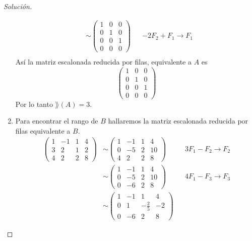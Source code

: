 \documentclass[a4,11pt]{aleph-notas}
\begin{document}
\begin{proof}[Solución]
\begin{enumerate}
\begin{align*}
            & \sim \begin{pmatrix}
            1 & 0 & 0\\
            0 & 1 & 0\\
            0 & 0 & 1\\
            0 & 0 & 0
            \end{pmatrix} &&
            -2F_2+F_1 \to F_1\\                
        \end{align*}
        Así la matriz escalonada reducida por filas, equivalente a $A$ es 
        \[
            \begin{pmatrix}
            1 & 0 & 0\\
            0 & 1 & 0\\
            0 & 0 & 1\\
            0 & 0 & 0
            \end{pmatrix}           
        \]
        Por lo tanto $\rang(A)=3$.
    \item 
        Para encontrar el rango de $B$ hallaremos la matriz escalonada reducida por filas equivalente a $B$.
        \begin{align*}
            \begin{pmatrix}
            1 & -1 & 1 & 4\\
            3 & 2 & 1 & 2\\
            4 & 2 & 2 & 8
            \end{pmatrix}
            & \sim 
            \begin{pmatrix}
            1 & -1 & 1 & 4\\
            0 & -5 & 2 & 10\\
            4 & 2 & 2 & 8
            \end{pmatrix} &&
            3F_1 - F_2 \to F_2\\
            & \sim 
            \begin{pmatrix}
            1 & -1 & 1 & 4\\
            0 & -5 & 2 & 10\\
            0 & -6 & 2 & 8
            \end{pmatrix} &&
            4F_1 - F_3 \to F_3\\
            & \sim 
            \begin{pmatrix}
            1 & -1 & 1 & 4\\
            0 & 1 & -\frac{2}{5} & -2\\
            0 & -6 & 2 & 8
            \end{pmatrix} &&

\end{align*}
\end{enumerate}
\end{proof}
\end{document}
